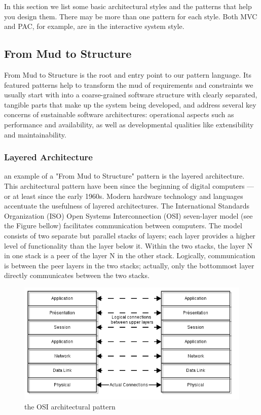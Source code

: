 In this section we list some basic architectural styles and the patterns that help you design them. There may be more than one pattern for each style. Both MVC and PAC, for example, are in the interactive system style.

\subsection{From Mud to Structure}
From Mud to Structure is the root and entry point to our pattern language. Its featured patterns help to transform the mud of requirements and constraints we usually start with into a coarse-grained software structure with clearly separated, tangible parts that make up the system being developed, and address several key concerns of sustainable software architectures: operational aspects such as performance and availability, as well as developmental qualities like extensibility and maintainability.

\subsubsection{Layered Architecture}
an example of a "From Mud to Structure" pattern is the layered architecture. This architectural pattern have been since the beginning of digital computers — or at least since the early 1960s. Modern hardware technology and languages accentuate the usefulness of layered architectures.
The International Standards Organization (ISO) Open Systems Interconnection (OSI) seven-layer model (see the Figure bellow) facilitates communication between computers. The model consists of two separate but parallel stacks of layers; each layer provides a higher level of functionality than the layer below it.
Within the two stacks, the layer N in one stack is a peer of the layer N in the other stack. Logically, communication is between the peer layers in the two stacks; actually, only the bottommost layer directly communicates between the two stacks.

\begin{figure}
\centering
\includegraphics[width=1\textwidth]{../images/osi_model.png}
\caption{\label{fig:frog} the OSI architectural pattern}
\end{figure}

